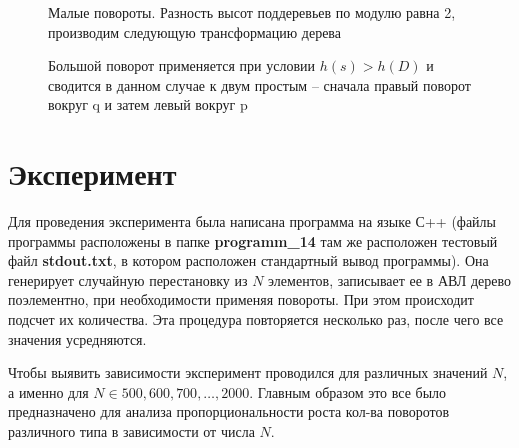 \documentclass[a4paper,12pt] {report} 			%
\begin{document}
\begin{figure} [h]
\caption{Малые повороты. Разность высот поддеревьев по модулю равна 2, производим следующую трансформацию дерева}
\end{figure}

\begin{figure} [h]
\caption{Большой поворот применяется при условии $h(s)>h(D)$ и сводится в данном случае к двум 
простым -- сначала правый поворот вокруг q и затем левый вокруг p}
\end{figure}

\section{Эксперимент}

Для проведения эксперимента была написана программа на языке С++ (файлы программы расположены в папке \textbf{programm\_14} там же расположен
тестовый файл \textbf{stdout.txt}, в котором расположен стандартный вывод программы). 
Она генерирует случайную перестановку из $N$ элементов, записывает ее в АВЛ дерево поэлементно, при необходимости применяя повороты. При этом 
происходит подсчет их количества. Эта процедура повторяется несколько раз, после чего все значения усредняются.

Чтобы выявить зависимости эксперимент проводился для различных значений $N$, а именно для $N \in {500, 600, 700, \ldots, 2000}$.
Главным образом это все было предназначено для анализа пропорциональности роста кол-ва поворотов различного типа в зависимости от числа $N$.
\end{document}

